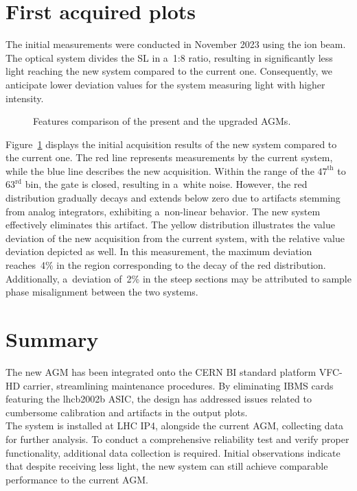 \section{First acquired plots}
The initial measurements were conducted in November 2023 using the ion beam.
The optical system divides the SL in a~1:8 ratio, resulting in significantly
less light reaching the new system compared to the current one. Consequently,
we anticipate lower deviation values for the system measuring light with higher
intensity.
\begin{figure}[!htb]
    \begin{center}
        \scalebox{0.54}{}
        \caption{Features comparison of the present and the upgraded AGMs.}
        \label{fig:comparison_chart}
    \end{center}
\end{figure}
Figure~\ref{fig:comparison_chart} displays the initial acquisition results of the new system compared to the current one. The red line represents
measurements by the current system, while the blue line describes the new
acquisition. Within the range of the $47^{\text{th}}$ to $63^{\text{rd}}$ bin, the gate is closed,
resulting in a~white noise. However, the red distribution gradually decays and extends
below zero due to artifacts stemming from analog integrators,
exhibiting a~non-linear behavior. The new system effectively eliminates this
artifact. The yellow distribution illustrates the value deviation of the new
acquisition from the current system, with the relative value deviation depicted
as well. In this measurement, the maximum deviation reaches~4\% in the region
corresponding to the decay of the red distribution. Additionally, a~deviation of~2\% in
the steep sections may be attributed to sample phase misalignment between the two systems.

\section{Summary}
The new AGM has been integrated onto the CERN BI standard platform VFC-HD
carrier, streamlining maintenance procedures. By eliminating IBMS cards
featuring the lhcb2002b ASIC, the design has addressed issues related to
cumbersome calibration and artifacts in the output plots. \\
The system is installed at LHC IP4, alongside the current AGM, collecting
data for further analysis. To conduct a comprehensive reliability test and
verify proper functionality, additional data collection is required. Initial
observations indicate that despite receiving less light, the new system can
still achieve comparable performance to the current AGM.





